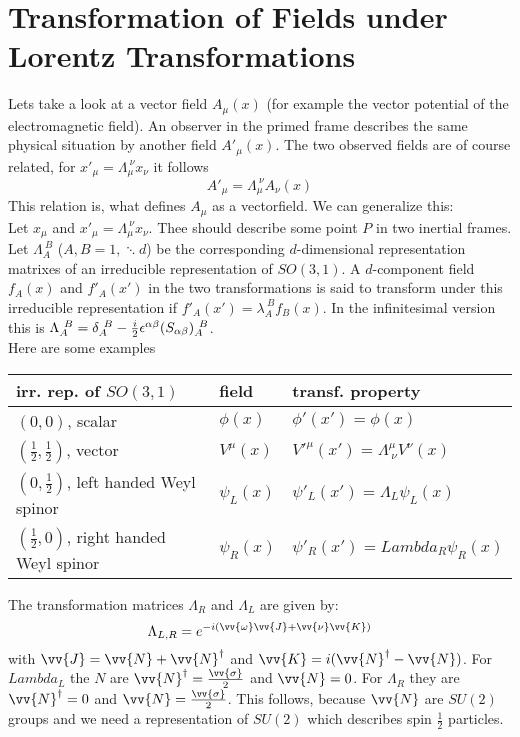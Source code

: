 \section{Transformation of Fields under Lorentz Transformations}
Lets take a look at a vector field $A_\mu(x)$ (for example the vector potential of the electromagnetic field). An observer in the primed frame describes the same physical situation by another field $A'_\mu(x)$. The two observed fields are of course related, for $x'_\mu = \Lambda_\mu^{~\nu}x_\nu$ it follows
\[A'_\mu = \Lambda_\mu^{~\nu}A_\nu(x)\]
This relation is, what defines $A_\mu$ as a vectorfield. We can generalize this:\\
Let $x_\mu$ and $x'_\mu = \Lambda_\mu^{~\nu} x_\nu$. Thee should describe some point $P$ in two inertial frames. Let $\Lambda_A^{~B}$ ($A,B = 1, \ddots d$) be the corresponding $d$-dimensional representation matrixes of an irreducible representation of $SO(3,1)$. A $d$-component field $f_A(x)$ and $f'_A(x')$ in the two transformations is said to transform under this irreducible representation if $f'_A(x') = \lambda_A^{~B} f_B(x)$. In the infinitesimal version this is $\Lambda_A^{~B} = \delta_A^{~B} - \frac{i}{2} \epsilon^{\alpha \beta}(S_{\alpha\beta})_A^{~B}$.\\
Here are some examples
\begin{table}[H]
\begin{tabular}{lll}
irr. rep. of $SO(3,1)$ & field & transf. property\\
\midrule
$\left(0, 0\right)$, scalar & $\phi(x)$ & $\phi'(x') = \phi(x)$\\
$\left(\frac{1}{2}, \frac{1}{2}\right)$, vector & $V^\mu(x)$ & $V'^\mu(x') = \Lambda^\mu_{~\nu}V^\nu(x)$\\
$\left(0,\frac{1}{2}\right)$, left handed Weyl spinor & $\psi_L(x)$ & $\psi'_L(x') = \Lambda_L \psi_L(x)$\\
$\left(\frac{1}{2}, 0 \right)$, right handed Weyl spinor & $\psi_R(x)$ & $\psi'_R(x') = Lambda_R \psi_R(x)$\\
\end{tabular}
\end{table}
The transformation matrices $\Lambda_R$ and $\Lambda_L$ are given by:
\[\Lambda_{L,R} = e^{-i(\vv{\omega}\vv{J} + \vv{\nu}\vv{K})}\]
with $\vv{J} = \vv{N} + \vv{N}^\dagger$ and $\vv{K} = i (\vv{N}^\dagger - \vv{N})$. For $Lambda_L$ the $N$ are $\vv{N}^\dagger = \frac{\vv{\sigma}}{2}$ and $\vv{N} = 0$. For $\Lambda_R$ they are $\vv{N}^\dagger = 0$ and $\vv{N} = \frac{\vv{\sigma}}{2}$. This follows, because $\vv{N}$ are $SU(2)$ groups and we need a representation of $SU(2)$ which describes spin $\frac{1}{2}$ particles.\\

